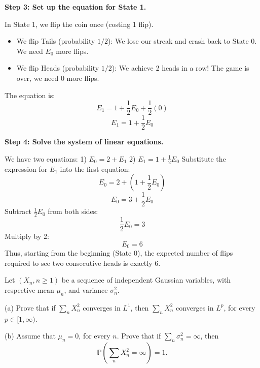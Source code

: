 \begin{solution}
\textbf{Step 3: Set up the equation for State 1.}

In State 1, we flip the coin once (costing 1 flip).
\begin{itemize}
    \item We flip Tails (probability $1/2$): We lose our streak and crash back to State 0. We need $E_0$ more flips.
    \item We flip Heads (probability $1/2$): We achieve 2 heads in a row! The game is over, we need 0 more flips.
\end{itemize}
The equation is:
\[ E_1 = 1 + \frac{1}{2} E_0 + \frac{1}{2} (0) \]
\[ E_1 = 1 + \frac{1}{2} E_0 \]

\textbf{Step 4: Solve the system of linear equations.}

We have two equations:
1) $E_0 = 2 + E_1$
2) $E_1 = 1 + \frac{1}{2} E_0$
Substitute the expression for $E_1$ into the first equation:
\[ E_0 = 2 + \left( 1 + \frac{1}{2} E_0 \right) \]
\[ E_0 = 3 + \frac{1}{2} E_0 \]
Subtract $\frac{1}{2} E_0$ from both sides:
\[ \frac{1}{2} E_0 = 3 \]
Multiply by 2:
\[ E_0 = 6 \]
Thus, starting from the beginning (State 0), the expected number of flips required to see two consecutive heads is exactly 6.
\end{solution}

\begin{exercise}\label{probability:2015:3}
Let $(X_n, n \geq 1)$ be a sequence of independent Gaussian variables, with respective mean $\mu_n$, and variance $\sigma_n^2$.

(a) Prove that if $\sum_n X_n^2$ converges in $L^1$, then $\sum_n X_n^2$ converges in $L^p$, for every $p \in [1, \infty)$.

(b) Assume that $\mu_n = 0$, for every $n$. Prove that if $\sum_n \sigma_n^2 = \infty$, then
\[
\mathbb{P}\left(\sum_n X_n^2 = \infty\right) = 1.
\]
\end{exercise}

